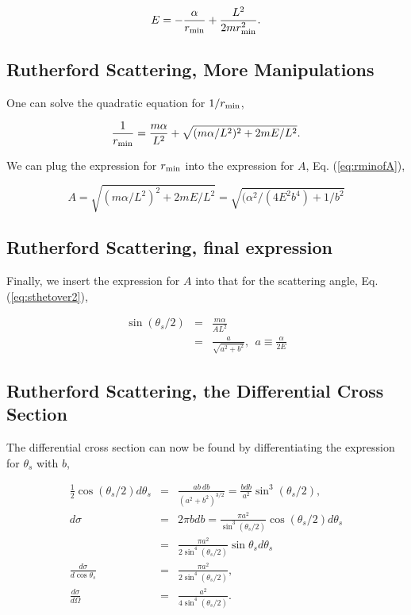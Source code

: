 \documentclass[%
oneside,                 %
final,                   %
10pt]{article}
\begin{document}
\begin{equation}
E=-\frac{\alpha}{r_{\rm min}}+\frac{L^2}{2mr_{\rm min}^2}.
\end{equation}

\subsection*{Rutherford Scattering, More Manipulations}

One can solve the quadratic equation for $1/r_{\rm min}$,

\begin{equation}
\frac{1}{r_{\rm min}}=\frac{m\alpha}{L^2}+\sqrt{(m\alpha/L^2)^2+2mE/L^2}.
\end{equation}

We can plug the expression for $r_{\rm min}$ into the expression for $A$, Eq. (\ref{eq:rminofA}),

\begin{equation}
A=\sqrt{(m\alpha/L^2)^2+2mE/L^2}=\sqrt{(\alpha^2/(4E^2b^4)+1/b^2}
\end{equation}

\subsection*{Rutherford Scattering, final expression}

Finally, we insert the expression for $A$ into that for the scattering angle, Eq. (\ref{eq:sthetover2}),

\begin{eqnarray}
\label{eq:scattangle}
\sin(\theta_s/2)&=&\frac{m\alpha}{AL^2}\\
\nonumber
&=&\frac{a}{\sqrt{a^2+b^2}}, ~~a\equiv \frac{\alpha}{2E}
\end{eqnarray}

\subsection*{Rutherford Scattering, the Differential Cross Section}

The differential cross section can now be found by differentiating the
expression for $\theta_s$ with $b$,

\begin{eqnarray}
\label{eq:rutherford}
\frac{1}{2}\cos(\theta_s/2)d\theta_s&=&\frac{ab~db}{(a^2+b^2)^{3/2}}=\frac{bdb}{a^2}\sin^3(\theta_s/2),\\
\nonumber
d\sigma&=&2\pi bdb=\frac{\pi a^2}{\sin^3(\theta_s/2)}\cos(\theta_s/2)d\theta_s\\
\nonumber
&=&\frac{\pi a^2}{2\sin^4(\theta_s/2)}\sin\theta_s d\theta_s\\
\nonumber
\frac{d\sigma}{d\cos\theta_s}&=&\frac{\pi a^2}{2\sin^4(\theta_s/2)},\\
\nonumber
\frac{d\sigma}{d\Omega}&=&\frac{a^2}{4\sin^4(\theta_s/2)}.
\end{eqnarray}
\end{document}

